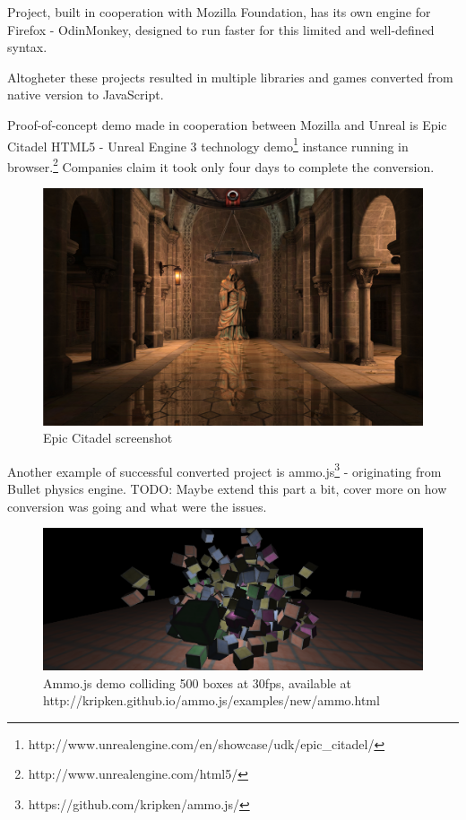 

Project, built in cooperation with Mozilla Foundation, has its own engine for Firefox - OdinMonkey, designed to run faster for this limited and well-defined syntax.

Altogheter these projects resulted in multiple libraries and games converted from native version to JavaScript.

Proof-of-concept demo made in cooperation between Mozilla and Unreal is Epic Citadel HTML5 - Unreal Engine 3 technology demo\footnote{http://www.unrealengine.com/en/showcase/udk/epic\_citadel/}  instance running in browser.\footnote{http://www.unrealengine.com/html5/} Companies claim it took only four days to complete the conversion.

\begin{figure}[h!]
  \caption{Epic Citadel screenshot}
  \label{img:epicitadel}
  \centering
	\includegraphics[width=16cm]{emscripten/epic-citadel.jpg}
\end{figure}

Another example of successful converted project is ammo.js\footnote{https://github.com/kripken/ammo.js/} - originating from Bullet physics engine.
TODO: Maybe extend this part a bit, cover more on how conversion was going and what were the issues.

\begin{figure}[h!]
  \caption{Ammo.js demo colliding 500 boxes at 30fps, available at http://kripken.github.io/ammo.js/examples/new/ammo.html}
  \label{img:epicitadel}
  \centering
	\includegraphics[width=16cm]{emscripten/ammojs.png}
\end{figure}

